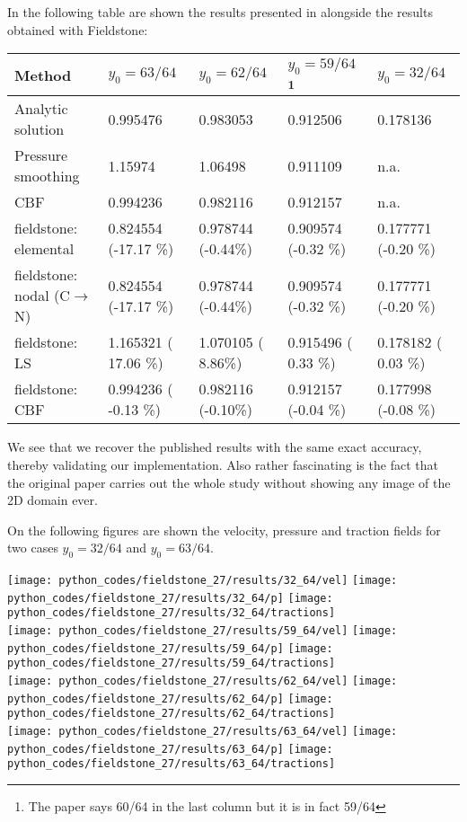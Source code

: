 In the following table are shown the results presented in \cite{zhgh93} alongside the results obtained with Fieldstone:
\begin{center}
\begin{tabular}{l||llll}
\hline
Method             & $y_0=63/64$ & $y_0=62/64$ &  $y_0=59/64$
\footnote{The paper says 60/64 in the last column but it is in fact 59/64}
 & $y_0=32/64$\\ 
\hline
\hline
Analytic solution                   & 0.995476 & 0.983053  &  0.912506 & 0.178136 \\
Pressure smoothing \cite{zhgh93}    & 1.15974  & 1.06498   &  0.911109 & n.a. \\
CBF                \cite{zhgh93}    & 0.994236 & 0.982116  &  0.912157 & n.a. \\
\hline
\hline
fieldstone: elemental               & 0.824554 (-17.17 \%) & 0.978744 (-0.44\%) & 0.909574 (-0.32 \%) & 0.177771 (-0.20 \%)\\
fieldstone: nodal (C$\rightarrow$N) & 0.824554 (-17.17 \%) & 0.978744 (-0.44\%) & 0.909574 (-0.32 \%) & 0.177771 (-0.20 \%)\\
fieldstone: LS                      & 1.165321 ( 17.06 \%) & 1.070105 ( 8.86\%) & 0.915496 ( 0.33 \%) & 0.178182 ( 0.03 \%)\\
fieldstone: CBF                     & 0.994236 ( -0.13 \%) & 0.982116 (-0.10\%) & 0.912157 (-0.04 \%) & 0.177998 (-0.08 \%)\\
\hline
\end{tabular}
\end{center}
We see that we recover the published results with the same exact accuracy, thereby validating our implementation. Also rather fascinating is the fact that the original paper carries out the whole study without showing any image of the 2D domain ever. 

On the following figures are shown the velocity, pressure and traction fields for two cases $y_0=32/64$ and $y_0=63/64$.
\begin{center}
\texttt{[image: python\_codes/fieldstone\_27/results/32\_64/vel]}
\texttt{[image: python\_codes/fieldstone\_27/results/32\_64/p]}
\texttt{[image: python\_codes/fieldstone\_27/results/32\_64/tractions]}\\
\texttt{[image: python\_codes/fieldstone\_27/results/59\_64/vel]}
\texttt{[image: python\_codes/fieldstone\_27/results/59\_64/p]}
\texttt{[image: python\_codes/fieldstone\_27/results/59\_64/tractions]}\\
\texttt{[image: python\_codes/fieldstone\_27/results/62\_64/vel]}
\texttt{[image: python\_codes/fieldstone\_27/results/62\_64/p]}
\texttt{[image: python\_codes/fieldstone\_27/results/62\_64/tractions]}\\
\texttt{[image: python\_codes/fieldstone\_27/results/63\_64/vel]}
\texttt{[image: python\_codes/fieldstone\_27/results/63\_64/p]}
\texttt{[image: python\_codes/fieldstone\_27/results/63\_64/tractions]}
\end{center}

